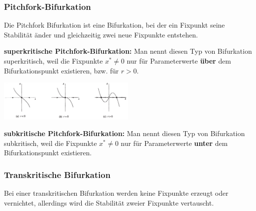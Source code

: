 \begin{multicols}{2}
	\subsubsection{Pitchfork-Bifurkation}
	Die Pitchfork Bifurkation ist eine Bifurkation, bei der ein Fixpunkt seine Stabilität änder und gleichzeitig zwei neue Fixpunkte entstehen. \newline \newline
	
	\textbf{superkritische Pitchfork-Bifurkation:} Man nennt diesen Typ von Bifurkation superkritisch, weil die Fixpunkte $x^* \neq 0$ nur für Parameterwerte \textbf{über} dem Bifurkationspunkt existieren, bzw. für $r >0$.
	
	\includegraphics[width=0.5\textwidth]{./images/superkritisch.png}
	\columnbreak
	
	\textbf{subkritische Pitchfork-Bifurkation:} Man nennt diesen Typ von Bifurkation subkritisch, weil die Fixpunkte $x^* \neq 0$ nur für Parameterwerte \textbf{unter} dem Bifurkationspunkt existieren.
	
	\subsubsection{Transkritische Bifurkation}
	Bei einer transkritischen Bifurkation werden keine Fixpunkte erzeugt oder vernichtet, allerdings wird die Stabilität zweier Fixpunkte vertauscht.
\end{multicols}

